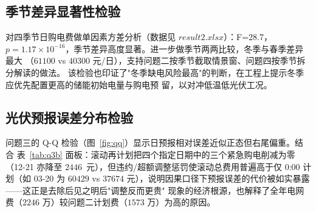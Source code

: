 \documentclass[withoutpreface]{cumcmthesis}
\begin{document}
\subsection{季节差异显著性检验}
对四季节日购电费做单因素方差分析（数据见 $result2.xlsx$）：F=28.7，
$p=1.17\times10^{-16}$，季节差异高度显著。进一步做季节两两比较，冬季与春季差异最大
（$61100$ vs $40300$ 元/日），支持问题二按季节截取情景窗、问题四按季节拆分解读的做法。
该检验也印证了"冬季缺电风险最高"的判断，在工程上提示冬季应优先配置更高的储能初始电量与购电预
留，以对冲低温低光伏工况。

\subsection{光伏预报误差分布检验}
问题三的 Q-Q 检验（图~\ref{fig:qq}）显示日预报相对误差近似正态但右尾偏重。结合
表~\ref{tab:q3b} 面板：滚动再计划把四个指定日期中的三个紧急购电削减为零（12-21 亦降至
$2446$~元），但违约/超额调整惩罚使滚动总费用普遍高于仅 0:00 计划（如 03-20 为 $60429$ vs
$37674$ 元），说明因果口径下预报误差的代价被如实暴露——这正是去除后见之明后"调整反而更贵"
现象的经济根源，也解释了全年电网费（$2246$ 万）较问题二计划费（$1573$ 万）为高的原因。
\end{document}
